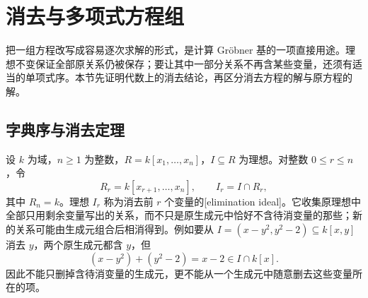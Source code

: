 

\section{消去与多项式方程组}
\label{b1:sec:F04}

把一组方程改写成容易逐次求解的形式，是计算 Gröbner 基的一项直接用途。理想不变保证全部原关系仍被保存；要让其中一部分关系不再含某些变量，还须有适当的单项式序。本节先证明代数上的消去结论，再区分消去方程的解与原方程的解。

\subsection{字典序与消去定理}
\label{b1:subsec:F04:01}

设 \(k\) 为域，\(n\geq1\) 为整数，\(R=k[x_1,\ldots,x_n]\)，\(I\subseteq R\) 为理想。对整数 \(0\leq r\leq n\)，令
\[
	R_r=k[x_{r+1},\ldots,x_n],\qquad I_r=I\cap R_r,
\]
其中 \(R_n=k\)。理想 \(I_r\) 称为消去前 \(r\) 个变量的[elimination ideal]。它收集原理想中全部只用剩余变量写出的关系，而不只是原生成元中恰好不含待消变量的那些；新的关系可能由生成元组合后相消得到。例如要从 \(I=(x-y^2,y^2-2)\subseteq k[x,y]\) 消去 \(y\)，两个原生成元都含 \(y\)，但
\[
	(x-y^2)+(y^2-2)=x-2\in I\cap k[x].
\]
因此不能只删掉含待消变量的生成元，更不能从一个生成元中随意删去这些变量所在的项。

